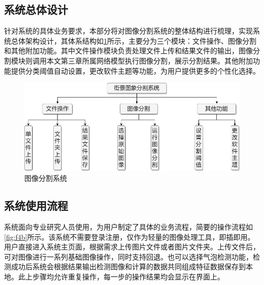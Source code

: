 \subsection{系统总体设计}
针对系统的具体业务要求，本部分将对图像分割系统的整体结构进行梳理，实现系统总体架构设计，其体系结构如\cref*{fig:f4a}所示，主要分为三个模块：文件操作、图像分割和其他附加功能。其中文件操作模块负责处理文件上传和结果文件的输出，图像分割模块则调用本文第三章所属网络模型执行图像分割，展示分割结果。其他附加功能提供分类阈值自动设置，更改软件主题等功能，为用户提供更多的个性化选择。


\begin{figure}[htb]
    \centering
    \includegraphics[width=12cm]{fig/chap4/系统架构图1.png}
    \caption{图像分割系统}
    \label{fig:f4a}
\end{figure}

\subsection{系统使用流程}
系统面向专业研究人员使用，为用户制定了具体的业务流程，简要的操作流程如\cref*{fig:f4b}所示。该系统不需要登录注册，仅作为轻量的图像处理工具，即插即用。用户直接进入系统主页面，根据需求上传图片文件或者图片文件夹。上传文件后，可对图像进行一系列基础图像操作，同时支持回退。也可以选择气泡检测功能，检测成功后系统会根据结果输出检测图像和计算的数据共同组成特征数据保存到本地。此上步骤均允许重复操作，每一步的操作结果均会显示在界面上。

